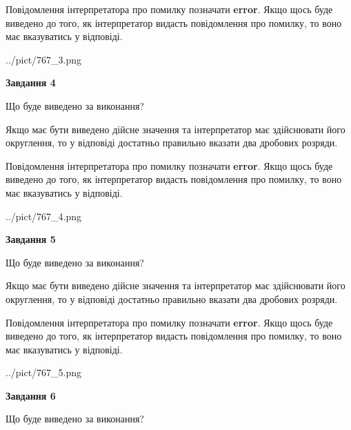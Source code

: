 \documentclass[12pt, ukrainian]{article}
\begin{document}
{\begin {Large}
Повідомлення інтерпретатора про помилку позначати \textbf{error}.
Якщо щось буде виведено до того, як інтерпретатор видасть повідомлення про помилку, 
то воно має вказуватись у відповіді. \par

\begin{center}
	{../pict/767_3.png}
\end{center}
\newpage

{\begin {center}\textbf{Завдання 4}\end {center}}\par
Що буде виведено за виконання? \par

Якщо має бути виведено дійсне значення та інтерпретатор має здійснювати його округлення, 
то у відповіді достатньо правильно вказати два дробових розряди.

Повідомлення інтерпретатора про помилку позначати \textbf{error}.
Якщо щось буде виведено до того, як інтерпретатор видасть повідомлення про помилку, 
то воно має вказуватись у відповіді. \par

\begin{center}
	{../pict/767_4.png}
\end{center}
\newpage

{\begin {center}\textbf{Завдання 5}\end {center}}\par
Що буде виведено за виконання? \par

Якщо має бути виведено дійсне значення та інтерпретатор має здійснювати його округлення, 
то у відповіді достатньо правильно вказати два дробових розряди.

Повідомлення інтерпретатора про помилку позначати \textbf{error}.
Якщо щось буде виведено до того, як інтерпретатор видасть повідомлення про помилку, 
то воно має вказуватись у відповіді. \par

\begin{center}
	{../pict/767_5.png}
\end{center}
\newpage

{\begin {center}\textbf{Завдання 6}\end {center}}\par
Що буде виведено за виконання? \par


\end{Large}}
\end{document}

